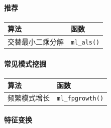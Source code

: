 \documentclass[
]{article}
\begin{document}
\hypertarget{ux63a8ux8350}{%
\paragraph{推荐}\label{ux63a8ux8350}}

\begin{longtable}[]{@{}ll@{}}
\toprule
算法 & 函数\tabularnewline
\midrule
\endhead
交替最小二乘分解 & \texttt{ml\_als()}\tabularnewline
\bottomrule
\end{longtable}

\hypertarget{ux5e38ux89c1ux6a21ux5f0fux6316ux6398}{%
\paragraph{常见模式挖掘}\label{ux5e38ux89c1ux6a21ux5f0fux6316ux6398}}

\begin{longtable}[]{@{}ll@{}}
\toprule
算法 & 函数\tabularnewline
\midrule
\endhead
频繁模式增长 & \texttt{ml\_fpgrowth()}\tabularnewline
\bottomrule
\end{longtable}

\hypertarget{ux7279ux5f81ux53d8ux6362}{%
\paragraph{特征变换}\label{ux7279ux5f81ux53d8ux6362}}
\end{document}
